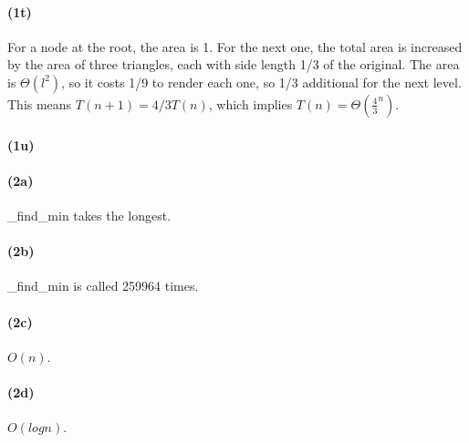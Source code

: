 \documentclass{article}
\begin{document}
\paragraph{(1t)}
For a node at the root, the area is 1. For the next one, the total area is increased by the area of three triangles, each with side length 1/3 of the original. The area is $\Theta(l^2)$, so it costs 1/9 to render each one, so 1/3 additional for the next level. This means $T(n+1)=4/3T(n)$, which implies $T(n)=\Theta(\frac{4}{3}^n)$.

\paragraph{(1u)}

\paragraph{(2a)}
_find_min takes the longest.

\paragraph{(2b)}
_find_min is called 259964 times.

\paragraph{(2c)}
$O(n)$.

\paragraph{(2d)}
$O(logn)$.
\end{document}
